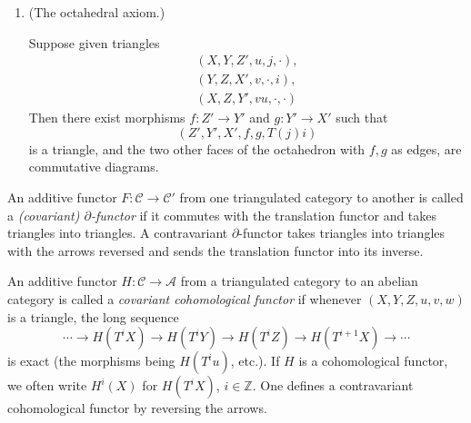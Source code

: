\begin{definition*}
\begin{enumerate}
	\item[\textbf{(TR4)}] \begin{minipage}[t]{\linewidth}
	(The octahedral axiom.)
	\begin{center}
	\end{center}
	\end{minipage}

	Suppose given triangles
	\[
	\begin{gathered}
		(X,Y,Z',u,j,\cdot),\\
		(Y,Z,X',v,\cdot,i),\\
		(X,Z,Y',vu,\cdot,\cdot)
	\end{gathered}
	\]
	Then there exist morphisms $f\colon Z'\to Y'$ and $g\colon Y'\to X'$ such that
	\[
	(Z',Y',X',f,g,T(j)i)
	\]
	is a triangle, and the two other faces of the octahedron with $f,g$ as edges, are commutative diagrams.
\end{enumerate}
\end{definition*}

\begin{definition*}
	An additive functor $F\colon \mathcal{C}\to\mathcal{C}'$ from one triangulated category to another is called a \emph{(covariant) $\partial$-functor} if it commutes with the translation functor and takes triangles into triangles. A contravariant $\partial$-functor takes triangles into triangles with the arrows reversed and sends the translation functor into its inverse.
\end{definition*}

\begin{definition*}
	An additive functor $H\colon \mathcal{C}\to\mathcal{A}$ from a triangulated category to an abelian category is called a \emph{covariant cohomological functor} if whenever $(X,Y,Z,u,v,w)$ is a triangle, the long sequence
	\[
	\cdots\to H(T^iX)\to H(T^iY)\to H(T^iZ)\to H(T^{i+1}X)\to\cdots
	\]
	is exact (the morphisms being $H(T^iu)$, etc.). If $H$ is a cohomological functor, we often write $H^i(X)$ for $H(T^iX)$, $i\in\mathbb{Z}$. One defines a contravariant cohomological functor by reversing the arrows.
\end{definition*}

